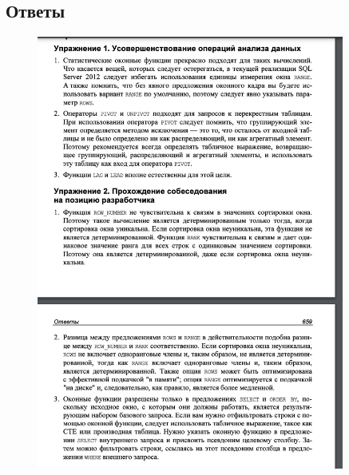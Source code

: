 \subsection*{Ответы}

\begin{figure}[h!]
	\begin{center}
		\includegraphics[width=0.9\textwidth]{img/ans14.png}
	\end{center}
	\captionsetup{justification=centering}
\end{figure}





